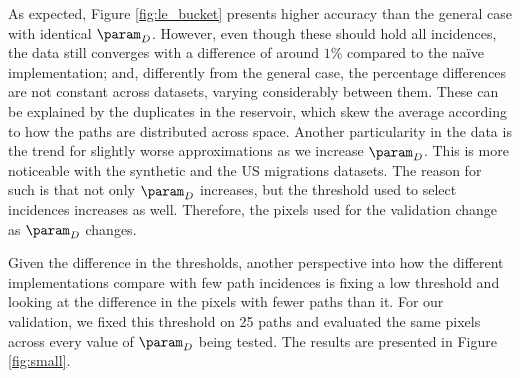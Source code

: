 As expected, Figure \ref{fig:le_bucket} presents higher accuracy than the general case with identical $\param_D$. However, even though these should hold all incidences, the data still converges with a difference of around $1\%$ compared to the na\"ive implementation; and, differently from the general case, the percentage differences are not constant across datasets, varying considerably between them. These can be explained by the duplicates in the reservoir, which skew the average according to how the paths are distributed across space. Another particularity in the data is the trend for slightly worse approximations as we increase $\param_D$. This is more noticeable with the synthetic and the US migrations datasets. The reason for such is that not only $\param_D$ increases, but the threshold used to select incidences increases as well. Therefore, the pixels used for the validation change as $\param_D$ changes.

Given the difference in the thresholds, another perspective into how the different implementations compare with few path incidences is fixing a low threshold and looking at the difference in the pixels with fewer paths than it. For our validation, we fixed this threshold on 25 paths and evaluated the same pixels across every value of $\param_D$ being tested. The results are presented in Figure \ref{fig:small}.

